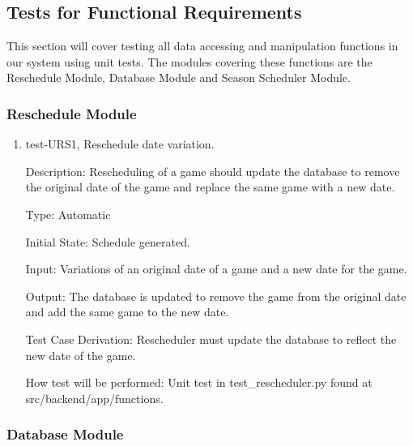 \documentclass[12pt, titlepage]{article}
\begin{document}
\subsection{Tests for Functional Requirements}


This section will cover testing all data accessing and manipulation functions
in our system using unit tests. The modules covering these functions are the
Reschedule Module, Database Module and Season Scheduler Module.

\subsubsection{Reschedule Module}


\begin{enumerate}

\item{test-URS1, Reschedule date variation.\\}

Description: Rescheduling of a game should update the database to remove
the original date of the game and replace the same game with a new date.

Type: Automatic

Initial State: Schedule generated.

Input: Variations of an original date of a game and a new date for the game.

Output: The database is updated to remove the game from the original date and
add the same game to the new date.

Test Case Derivation: Rescheduler must update the database to reflect the new
date of the game.

How test will be performed: Unit test in test\_rescheduler.py found at
src/backend/app/functions.

\end{enumerate}

\subsubsection{Database Module}
\end{document}
